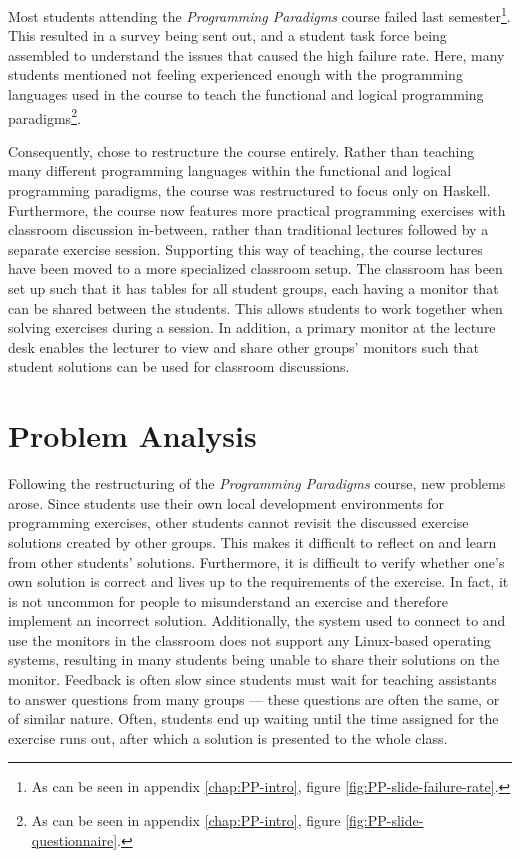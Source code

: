 Most students attending the \textit{Programming Paradigms} course failed last semester\footnote{As can be seen in appendix \ref{chap:PP-intro}, figure \ref{fig:PP-slide-failure-rate}.}.
This resulted in a survey being sent out, and a student task force being assembled to understand the issues that caused the high failure rate.
Here, many students mentioned not feeling experienced enough with the programming languages used in the course to teach the functional and logical programming paradigms\footnote{As can be seen in appendix \ref{chap:PP-intro}, figure \ref{fig:PP-slide-questionnaire}.}.

Consequently, \aau{} chose to restructure the course entirely.
Rather than teaching many different programming languages within the functional and logical programming paradigms, the course was restructured to focus only on Haskell.
Furthermore, the course now features more practical programming exercises with classroom discussion in-between, rather than traditional lectures followed by a separate exercise session.
Supporting this way of teaching, the course lectures have been moved to a more specialized classroom setup. The classroom has been set up such that it has tables for all student groups, each having a monitor that can be shared between the students. This allows students to work together when solving exercises during a session.
In addition, a primary monitor at the lecture desk enables the lecturer to view and share other groups' monitors such that student solutions can be used for classroom discussions.


\section{Problem Analysis}
Following the restructuring of the \textit{Programming Paradigms} course, new problems arose.
Since students use their own local development environments for programming exercises, other students cannot revisit the discussed exercise solutions created by other groups.
This makes it difficult to reflect on and learn from other students' solutions.
Furthermore, it is difficult to verify whether one's own solution is correct and lives up to the requirements of the exercise.
In fact, it is not uncommon for people to misunderstand an exercise and therefore implement an incorrect solution.
Additionally, the system used to connect to and use the monitors in the classroom does not support any Linux-based operating systems, resulting in many students being unable to share their solutions on the monitor.
Feedback is often slow since students must wait for teaching assistants to answer questions from many groups --- these questions are often the same, or of similar nature.
Often, students end up waiting until the time assigned for the exercise runs out, after which a solution is presented to the whole class.

